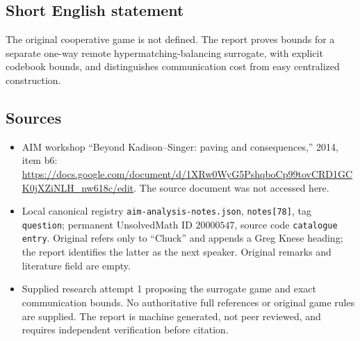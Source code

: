 \documentclass[11pt]{article}
\begin{document}
\subsection{Short English statement}
The original cooperative game is not defined. The report proves bounds for a separate one-way remote hypermatching-balancing surrogate, with explicit codebook bounds, and distinguishes communication cost from easy centralized construction.
\subsection{Sources}
\begin{itemize}
\item AIM workshop ``Beyond Kadison--Singer: paving and consequences,'' 2014, item b6: \url{https://docs.google.com/document/d/1XRw0WyG5PshqboCp99tovCRD1GCK0jXZiNLH_nw618c/edit}. The source document was not accessed here.
\item Local canonical registry \texttt{aim-analysis-notes.json}, \texttt{notes[78]}, tag \texttt{question}; permanent UnsolvedMath ID \(20000547\), source code \texttt{catalogue entry}. Original refers only to ``Chuck'' and appends a Greg Knese heading; the report identifies the latter as the next speaker. Original remarks and literature field are empty.
\item Supplied research attempt 1 proposing the surrogate game and exact communication bounds. No authoritative full references or original game rules are supplied. The report is machine generated, not peer reviewed, and requires independent verification before citation.
\end{itemize}
\end{document}
